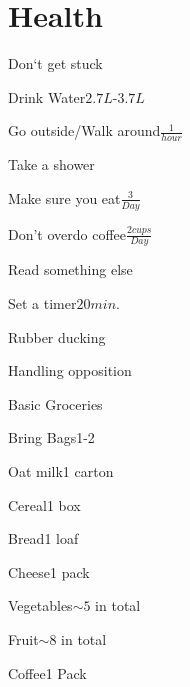 
\section{Health}
\begin{checklist}{Don`t get stuck}
  \item{Drink Water}{$2.7L$-$3.7L$\cite{appel2005dietary}} 
  \item{Go outside/Walk around}{$\frac{1}{hour}$}
  \item{Take a shower}{}
  \item{Make sure you eat}{$\frac{3}{Day}$}
  \item{Don't overdo coffee}{$\frac{2 cups}{Day}$}
  \item{Read something else}{\cite{compiling}}
  \item{Set a timer}{$20 min.$}
  \item{Rubber ducking}{}%
\end{checklist}

\begin{checklist}{Handling opposition}%
\end{checklist}

\begin{checklist}{Basic Groceries}
    \item{Bring Bags}{1-2}
    \item{Oat milk}{1 carton} 
    \item{Cereal}{1 box}
    \item{Bread}{1 loaf}
    \item{Cheese}{1 pack}
    \item{Vegetables}{$\sim 5$ in total}
    \item{Fruit}{$\sim 8$ in total}
    \item{Coffee}{1 Pack}
\end{checklist}